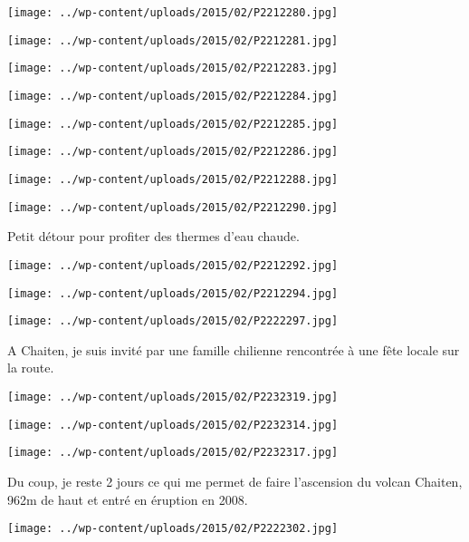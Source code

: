  \newline
\centerline{\texttt{[image: ../wp-content/uploads/2015/02/P2212280.jpg]} } 
 \newline
\centerline{\texttt{[image: ../wp-content/uploads/2015/02/P2212281.jpg]} } 
 \newline
\centerline{\texttt{[image: ../wp-content/uploads/2015/02/P2212283.jpg]} } 
 \newline
\centerline{\texttt{[image: ../wp-content/uploads/2015/02/P2212284.jpg]} } 
 \newline
\centerline{\texttt{[image: ../wp-content/uploads/2015/02/P2212285.jpg]} } 
 \newline
\centerline{\texttt{[image: ../wp-content/uploads/2015/02/P2212286.jpg]} } 
 \newline
\centerline{\texttt{[image: ../wp-content/uploads/2015/02/P2212288.jpg]} } 
 \newline
\centerline{\texttt{[image: ../wp-content/uploads/2015/02/P2212290.jpg]} } 
Petit détour pour profiter des thermes d'eau chaude. \newline
 \newline
\centerline{\texttt{[image: ../wp-content/uploads/2015/02/P2212292.jpg]} } 
\newline
\centerline{\texttt{[image: ../wp-content/uploads/2015/02/P2212294.jpg]} } 
 \newline
\centerline{\texttt{[image: ../wp-content/uploads/2015/02/P2222297.jpg]} } 
A Chaiten, je suis invité par une famille chilienne rencontrée à une fête locale sur la route. \newline
 \newline
\centerline{\texttt{[image: ../wp-content/uploads/2015/02/P2232319.jpg]} } 
 \newline
\centerline{\texttt{[image: ../wp-content/uploads/2015/02/P2232314.jpg]} } 
 \newline
\centerline{\texttt{[image: ../wp-content/uploads/2015/02/P2232317.jpg]} } 
Du coup, je reste 2 jours ce qui me permet de faire l'ascension du volcan Chaiten, 962m de haut et entré en éruption en 2008. \newline
 \newline
\centerline{\texttt{[image: ../wp-content/uploads/2015/02/P2222302.jpg]} } 
  \newline
